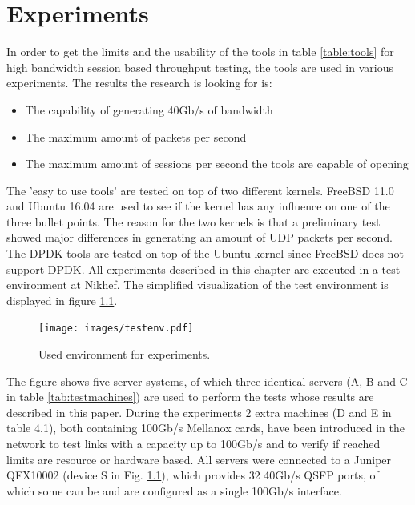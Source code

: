 \chapter{Experiments}\label{ch:experiments}
In order to get the limits and the usability of the tools in table \ref{table:tools} for high bandwidth session based throughput testing, the tools are used in various experiments.
The results the research is looking for is: 
\begin{itemize}
\item{The capability of generating 40Gb/s of bandwidth} 
\item{The maximum amount of packets per second} 
\item{The maximum amount of sessions per second the tools are capable of opening}
\end{itemize}

The 'easy to use tools' are tested on top of two different kernels. 
FreeBSD 11.0 and Ubuntu 16.04 are used to see if the kernel has any influence on one of the three bullet points.
The reason for the two kernels is that a preliminary test showed major differences in generating an amount of UDP packets per second.  
The DPDK tools are tested on top of the Ubuntu kernel since FreeBSD does not support DPDK.
All experiments described in this chapter are executed in a test environment at Nikhef. The simplified visualization of the test environment is displayed in figure \ref{fig:testenv}. \\ 

\begin{figure}[H]
  \texttt{[image: images/testenv.pdf]}
  \caption{Used environment for experiments.}
  \label{fig:testenv}
\end{figure}

The figure shows five server systems, of which three identical servers (A, B and C in table \ref{tab:testmachines}) are used to perform the tests whose results are described in this paper.
During the experiments 2 extra machines (D and E in table 4.1), both containing 100Gb/s Mellanox cards, have been introduced in the network to test links with a capacity up to 100Gb/s and to verify if reached limits are resource or hardware based. All servers were connected to a Juniper QFX10002 (device S in Fig. \ref{fig:testenv}), which provides 32 40Gb/s QSFP ports, of which some can be and are configured as a single 100Gb/s interface.


